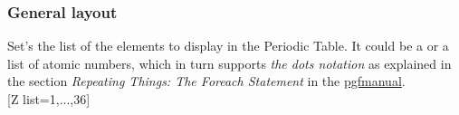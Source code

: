 \subsubsection{\texorpdfstring{ General layout}{General layout}}\vspace{6pt}%
\label{option_Z list}%
%
{Set's the list of the elements to display in the Periodic Table. It could be a  or a  list of atomic numbers, which in turn supports \textit{the dots notation} as explained in the section \textit{Repeating Things: The Foreach Statement} in the \href{https://www.ctan.org/pkg/pgf}{pgfmanual}.}
\\ [5pt][Z list={1,...,36}]%
\\ [5pt]\makebox[\linewidth][c]{\scalebox{.6}{\pgfPT[Z list={1,...,36}]}}%
